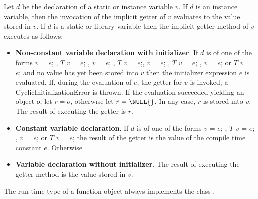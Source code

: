 \documentclass{article}
\newcommand{\code}[1]{{\sf #1}}
\begin{document}
\LMHash{}
Let $d$ be the declaration of a static or instance variable $v$.  If $d$ is an instance variable, then the invocation of the implicit getter  of $v$ evaluates to the value stored in $v$.
If $d$ is a static or library variable then the implicit getter method of $v$ executes as follows: \begin{itemize}
\item {\bf Non-constant variable declaration with initializer}. If $d$ is of one of the forms \code{\VAR{} $v$ = $e$;} ,  \code{$T$ $v$ = $e$;} ,   \code{\FINAL{} $v$ = $e$;} ,  \code{\FINAL{} $T$ $v$ = $e$;}, \code{\STATIC{} $v$ = $e$; }, \code{\STATIC{} $T$ $v$ = $e$; }, \code{\STATIC{} \FINAL{} $v$ = $e$; } or \code{\STATIC{} \FINAL{} $T$ $v$ = $e$;} and no value has yet been stored into $v$ then the initializer expression $e$ is evaluated. If, during the evaluation of $e$, the getter for $v$ is invoked, a \code{CyclicInitializationError} is thrown. If the evaluation succeeded yielding an object $o$, let $r = o$, otherwise let $r = \NULL{}$. In any case, $r$ is stored into $v$. The result of executing the getter is $r$. \item  {\bf Constant variable declaration}. If $d$ is of one of the forms \code{\CONST{} $v$ = $e$; } ,  \code{\CONST{} $T$  $v$ = $e$; },  \code{\STATIC{} \CONST{} $v$ = $e$; }  or \code{\STATIC{} \CONST{} $T$ $v$ = $e$;} the result of the getter is the value of the compile time constant $e$. 
Otherwise%
\item {\bf Variable declaration without initializer}. The result of executing the getter method is the value stored in $v$.
\end{itemize}


\LMHash{}
The run time type of a function object always implements the class .


\end{document}
